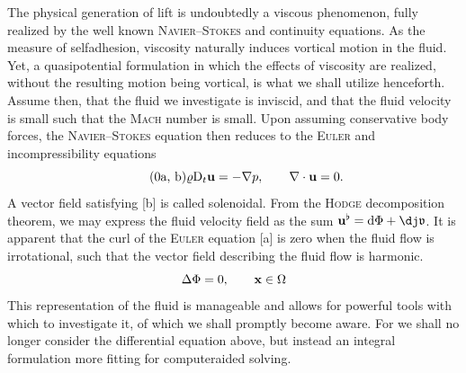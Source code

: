 The physical generation of lift is undoubtedly a viscous phenomenon, fully realized by the well known \textsc{Navier}--\textsc{Stokes} and continuity equations.
As the measure of selfadhesion, viscosity naturally induces vortical motion in the fluid.
Yet, a quasipotential formulation in which the effects of viscosity are realized, without the resulting motion being vortical, is what we shall utilize henceforth.
Assume then, that the fluid we investigate is inviscid, and that the fluid velocity is small such that the \textsc{Mach} number is small.
Upon assuming conservative body forces, the \textsc{Navier}--\textsc{Stokes} equation then reduces to the \textsc{Euler} and incompressibility equations
\begin{subequations}\label{eq:Euler_Incompressible}
  \begin{equation}\tag{\theequation{a, b}}
    \varrho\Dee_t \uvec = -\nabla p, \qquad \nabla \cdot \uvec = 0.
  \end{equation}
\end{subequations}
A vector field satisfying \subeqref{\ref{eq:Euler_Incompressible}}[b] is called solenoidal.
From the \textsc{Hodge} decomposition theorem, we may express the fluid velocity field as the sum $\uvec^{\flat} = \dee\Phi + \codee\vfrak$.
It is apparent that the curl of the \textsc{Euler} equation \subeqref{\ref{eq:Euler_Incompressible}}[a] is zero when the fluid flow is irrotational, such that the vector field describing the fluid flow is harmonic.
\begin{equation}\label{eq:Laplace_equation}
  \Delta \Phi = 0, \qquad \mathbf{x} \in \Omega
\end{equation}
This representation of the fluid is manageable and allows for powerful tools with which to investigate it, of which we shall promptly become aware.
For we shall no longer consider the differential equation above, but instead an integral formulation more fitting for computeraided solving.

